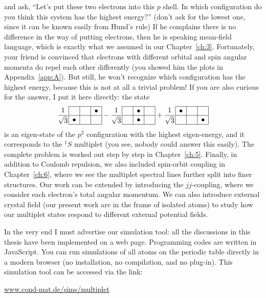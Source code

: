 \vspace{-1.5em}
and ask, ``Let's put these two electrons into this $p$ shell.
In which configuration do you think this system has the highest energy?''
(don't ask for the lowest one, since it can be known easily from
Hund's rule) If he complains there is no difference in the way of putting
electrons, then he is speaking mean-field language, which is exactly what
we assumed in our Chapter~\ref{ch:3}. Fortunately, your friend is convinced
that electrons with different orbital and spin angular momenta
do repel each other differently (you showed him the plots in
Appendix~\ref{app:A}). But still, he won't
recognize which configuration has the highest energy, because this is
not at all a trivial problem! If you are also curious for the answer, I put
it here directly: the state
\begin{equation*}
\frac{1}{\sqrt{3}}
\begin{array}{|c|c|c|}
\hline
 & \phantom{\bullet} & \bullet \\ \hline
\bullet &  &  \\
\hline
\end{array}
- \frac{1}{\sqrt{3}}
\begin{array}{|c|c|c|}
\hline
\phantom{\bullet} & \bullet & \phantom{\bullet} \\ \hline
 & \bullet &  \\
\hline
\end{array}
+ \frac{1}{\sqrt{3}}
\begin{array}{|c|c|c|}
\hline
\bullet & \phantom{\bullet} & \\ \hline
 &  & \bullet \\
\hline
\end{array}
\end{equation*}
is an eigen-state of the $p^2$ configuration with the highest eigen-energy,
and it corresponds to the $^1S$ multiplet
(you see, nobody could answer this easily).
The complete problem is worked out step by step in Chapter~\ref{ch:5}.
Finally, in addition to Coulomb repulsion, we also included
spin-orbit coupling in Chapter~\ref{ch:6}, where we see the multiplet
spectral lines further split into finer structures.
Our work can be extended by introducing the $jj$-coupling,
where we consider each electron's total angular momentum. We can also
introduce external crystal field (our present work are in the frame of isolated
atoms) to study how our multiplet states respond to different external potential fields.

In the very end I must advertise our simulation tool: all the discussions in
this thesis have been implemented on a web page. Programming codes are written
in JavaScript. You can run simulations of all atoms on the periodic table
directly in a modern browser (no installation,
no compilation, and no plug-in).
This simulation tool can be accessed via the link:
\begin{center}
\url{www.cond-mat.de/sims/multiplet}
\end{center}
